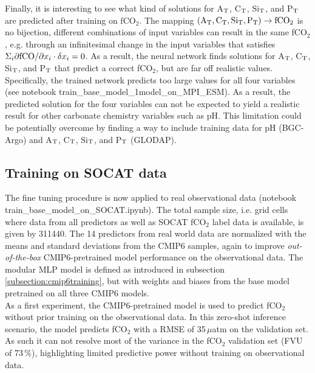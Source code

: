 \documentclass{article}
\begin{document}
	Finally, it is interesting to see what kind of solutions for A$_\textup{T}$, C$_\textup{T}$, Si$_\textup{T}$, and P$_\textup{T}$ are predicted after training on fCO$_2$. The mapping $(\textup{A}_\textup{T}, \textup{C}_\textup{T}, \textup{Si}_\textup{T}, \textup{P}_\textup{T}) \rightarrow \textup{fCO}_2$ is no bijection, different combinations of input variables can result in the same fCO$_2$, e.g. through an infinitesimal change in the input variables that satisfies $\Sigma_i \partial \textup{fCO} / \partial x_i \cdot \delta x_i = 0$. As a result, the neural network finds solutions for A$_\textup{T}$, C$_\textup{T}$, Si$_\textup{T}$, and P$_\textup{T}$ that predict a correct fCO$_2$, but are far off realistic values. Specifically, the trained network predicts too large values for all four variables (see notebook train\_base\_model\_1model\_on\_MPI\_ESM). As a result, the predicted solution for the four variables can not be expected to yield a realistic result for other carbonate chemistry variables such as pH. This limitation could be potentially overcome by finding a way to include training data for pH (BGC-Argo) and  A$_\textup{T}$, C$_\textup{T}$, Si$_\textup{T}$, and P$_\textup{T}$ (GLODAP).
	
	
	\subsection{Training on SOCAT data}
	
	The fine tuning procedure is now applied to real observational data (notebook train\_base\_model\_on\_SOCAT.ipynb). The total sample size, i.e. grid cells where data from all predictors as well as SOCAT fCO$_2$ label data is available, is given by 311440. The 14 predictors from real world data are normalized with the means and standard deviations from the CMIP6 samples, again to improve \textit{out-of-the-box} CMIP6-pretrained model performance on the observational data. The modular MLP model is defined as introduced in subsection \ref{subsection:cmip6training}, but with weights and biases from the base model pretrained on all three CMIP6 models. \\
	
	
	As a first experiment, the CMIP6-pretrained model is used to predict fCO$_2$ without prior training on the observational data. In this zero-shot inference scenario, the model predicts fCO$_2$ with a RMSE of 35\,$\mu$atm on the validation set. As such it can not resolve most of the variance in the fCO$_2$ validation set (FVU of 73\,\%), highlighting limited predictive power without training on observational data.  \\
	
\end{document}
